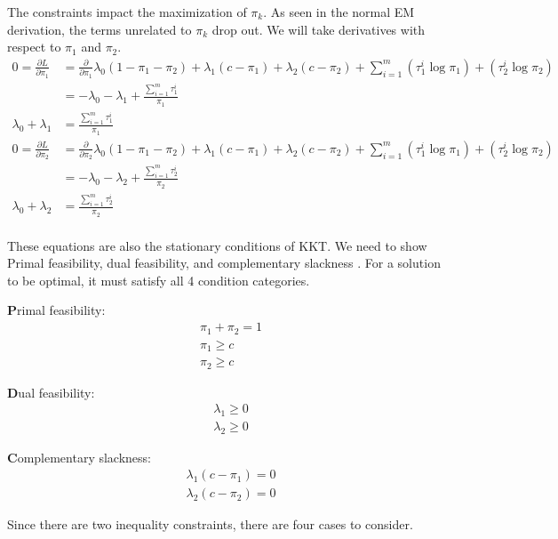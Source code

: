 \documentclass[12pt]{article}
\begin{document}
The constraints impact the maximization of $\pi_k$. As seen in the normal EM derivation, the terms unrelated to $\pi_k$ drop out. We will take derivatives with respect to $\pi_1$ and $\pi_2$.
\begin{align*}
    0 =\frac{\partial L}{\partial \pi_1} &= \frac{\partial}{\partial \pi_1}\lambda_0(1 - \pi_1 - \pi_2 ) + \lambda_1(c-\pi_1) + \lambda_2(c-\pi_2) + \sum_{i=1}^m (\tau_1^i\log\pi_1)+(\tau_2^i\log\pi_2)\\
    &= -\lambda_0 - \lambda_1 +  \frac{\sum_{i=1}^m \tau_1^i}{\pi_1}\\
    \lambda_0 + \lambda_1  &= \frac{\sum_{i=1}^m \tau_1^i}{\pi_1}\\
    0 =\frac{\partial L}{\partial \pi_2} &= \frac{\partial}{\partial \pi_2}\lambda_0(1 - \pi_1 - \pi_2 ) + \lambda_1(c-\pi_1) + \lambda_2(c-\pi_2) + \sum_{i=1}^m (\tau_1^i\log\pi_1)+(\tau_2^i\log\pi_2) \\
     &= -\lambda_0  - \lambda_2 + \frac{\sum_{i=1}^m \tau_2^i}{\pi_2} \\
     \lambda_0 + \lambda_2 &= \frac{\sum_{i=1}^m \tau_2^i}{\pi_2} \\
\end{align*}

These equations are also the stationary conditions of KKT. We need to show Primal feasibility, dual feasibility, and complementary slackness \cite{enwiki:1310095500}. For a solution to be optimal, it must satisfy all 4 condition categories.

{\textbf Primal feasibility:}
\begin{align*}
\pi_1 + \pi_2 = 1 \\
\pi_1 \geq c \\
\pi_2 \geq c 
\end{align*}

{\textbf Dual feasibility:}
\begin{align*}
\lambda_1 \geq 0 \\
\lambda_2 \geq 0 
\end{align*}

{\textbf Complementary slackness:}
\begin{align*}
\lambda_1(c-\pi_1) = 0 \\
\lambda_2(c-\pi_2) = 0
\end{align*}

Since there are two inequality constraints, there are four cases to consider.
\end{document}
